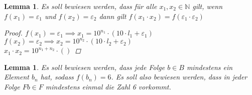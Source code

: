 \documentclass[12pt, letterpaper]{article}
\newtheorem{lemma}[theorem]{Lemma}
\begin{document}
  \begin{lemma}
   Es soll bewiesen werden, dass für alle $x_{1},x_{2}\in \mathbb{N}$ gilt, wenn $f(x_{1})=\varepsilon_{1}$ und $f(x_{2}) = \varepsilon_{2}$ dann gilt $f(x_{1}\cdot x_{2}) = f(\varepsilon_{1}\cdot \varepsilon_{2})$
  \begin{proof}
   $f(x_{1}) = \varepsilon_{1}\implies x_{1} =10^{n_{1}}\cdot (10\cdot l_{1} + \varepsilon_{1})  $\\
   $f(x_{2}) = \varepsilon_{2}\implies x_{2} =10^{n_{2}}\cdot (10\cdot l_{2} + \varepsilon_{2})  $\\
   $x_{1}\cdot x_{2} = 10^{n_{1}+n_{2}}\cdot ()$
  \end{proof}
  \end{lemma}
  \begin{lemma}
    Es soll bewiesen werden, dass jede Folge $b\in B$ mindestens ein Element $b_{n}$ hat, sodass $f(b_{n}) = 6$. Es soll also bewiesen werden, dass in jeder Folge $Fb \in F$ mindestens einmal die Zahl 6 vorkommt. 
  \end{lemma}
\end{document}

